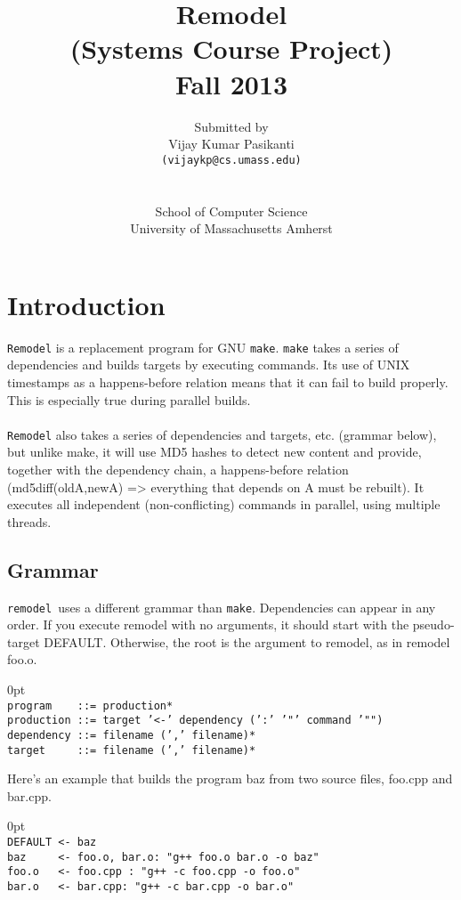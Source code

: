 \documentclass[12pt,letterpaper,titlepage, one-sided]{article}
\title{Remodel\\
(Systems Course Project)\\
Fall 2013}
\author{Submitted by\\
Vijay Kumar Pasikanti\\
\texttt{(vijaykp@cs.umass.edu)}\\
\\
\\
School of Computer Science\\
University of Massachusetts Amherst
}
\begin{document}
\newcommand{\remodel}{\texttt{remodel }}
\newcommand{\shellcmd}[1]{\\\indent\indent\texttt{#1}}
\maketitle
\tableofcontents
\newpage
\section{Introduction}
  \texttt{Remodel} is a replacement program for GNU \texttt{make}. \texttt{make} takes a series of dependencies and builds targets by executing commands. Its use of UNIX timestamps as a happens-before relation means that it can fail to build properly. This is especially true during parallel builds. \\ \\
  \texttt{Remodel} also takes a series of dependencies and targets, etc. (grammar below), but unlike make, it will use MD5 hashes to detect new content and provide, together with the dependency chain, a happens-before relation (md5diff(oldA,newA) => everything that depends on A must be rebuilt). It executes all independent (non-conflicting) commands in parallel, using multiple threads. 
  
	\subsection{Grammar}
	\remodel uses a different grammar than \texttt{make}. Dependencies can appear in any order. If you execute remodel with no arguments, it should start with the pseudo-target DEFAULT. Otherwise, the root is the argument to remodel, as in remodel foo.o. 
	\begin{adjustwidth}{.6in} {0pt}
	\texttt{\\
    program \ \ \ ::= production*\\
    production ::= target '<-' dependency (':' '"' command '"")\\
    dependency ::= filename (',' filename)*\\
    target\ \ \ \ \ ::= filename (',' filename)*\\
    }
	\end{adjustwidth}
	Here's an example that builds the program baz from two source files, foo.cpp and bar.cpp. 
	\begin{adjustwidth}{.6in} {0pt}
	\texttt{\\
    DEFAULT <- baz\\
    baz\ \ \ \ \ <- foo.o, bar.o: "g++ foo.o bar.o -o baz"\\
    foo.o  \ \ <- foo.cpp : "g++ -c foo.cpp -o foo.o"\\
    bar.o \ \ <- bar.cpp: "g++ -c bar.cpp -o bar.o"\\
 	}
	\end{adjustwidth}
\end{document}
